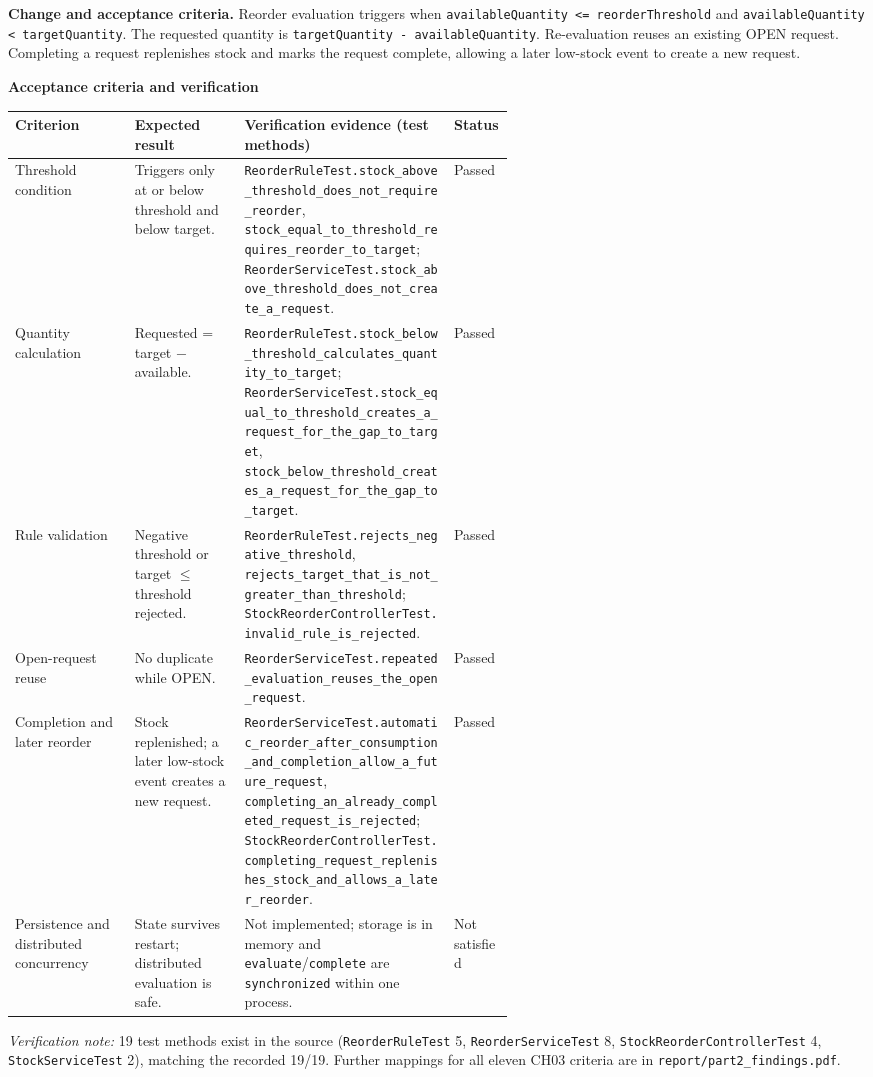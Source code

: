 \documentclass[11pt,a4paper]{article}
\newcommand{\code}[1]{\nolinkurl{#1}}
\begin{document}
\textbf{Change and acceptance criteria.} Reorder evaluation triggers when \code{availableQuantity <= reorderThreshold} and \code{availableQuantity < targetQuantity}. The requested quantity is \code{targetQuantity - availableQuantity}. Re-evaluation reuses an existing OPEN request. Completing a request replenishes stock and marks the request complete, allowing a later low-stock event to create a new request.

\textbf{Acceptance criteria and verification}

\begin{tabularx}{\linewidth}{@{}P{0.24\linewidth}P{0.22\linewidth}YP{0.12\linewidth}@{}}
\toprule
Criterion & Expected result & Verification evidence (test methods) & Status\\
\midrule
Threshold condition & Triggers only at or below threshold and below target. & \code{ReorderRuleTest.stock_above_threshold_does_not_require_reorder}, \code{stock_equal_to_threshold_requires_reorder_to_target}; \code{ReorderServiceTest.stock_above_threshold_does_not_create_a_request}. & Passed\\
Quantity calculation & Requested = target $-$ available. & \code{ReorderRuleTest.stock_below_threshold_calculates_quantity_to_target}; \code{ReorderServiceTest.stock_equal_to_threshold_creates_a_request_for_the_gap_to_target}, \code{stock_below_threshold_creates_a_request_for_the_gap_to_target}. & Passed\\
Rule validation & Negative threshold or target $\le$ threshold rejected. & \code{ReorderRuleTest.rejects_negative_threshold}, \code{rejects_target_that_is_not_greater_than_threshold}; \code{StockReorderControllerTest.invalid_rule_is_rejected}. & Passed\\
Open-request reuse & No duplicate while OPEN. & \code{ReorderServiceTest.repeated_evaluation_reuses_the_open_request}. & Passed\\
Completion and later reorder & Stock replenished; a later low-stock event creates a new request. & \code{ReorderServiceTest.automatic_reorder_after_consumption_and_completion_allow_a_future_request}, \code{completing_an_already_completed_request_is_rejected}; \code{StockReorderControllerTest.completing_request_replenishes_stock_and_allows_a_later_reorder}. & Passed\\
Persistence and distributed concurrency & State survives restart; distributed evaluation is safe. & Not implemented; storage is in memory and \code{evaluate}/\code{complete} are \code{synchronized} within one process. & Not satisfied\\
\bottomrule
\end{tabularx}
\textit{Verification note:} 19 test methods exist in the source (\code{ReorderRuleTest} 5, \code{ReorderServiceTest} 8, \code{StockReorderControllerTest} 4, \code{StockServiceTest} 2), matching the recorded 19/19. Further mappings for all eleven CH03 criteria are in \code{report/part2_findings.pdf}.
\end{document}
